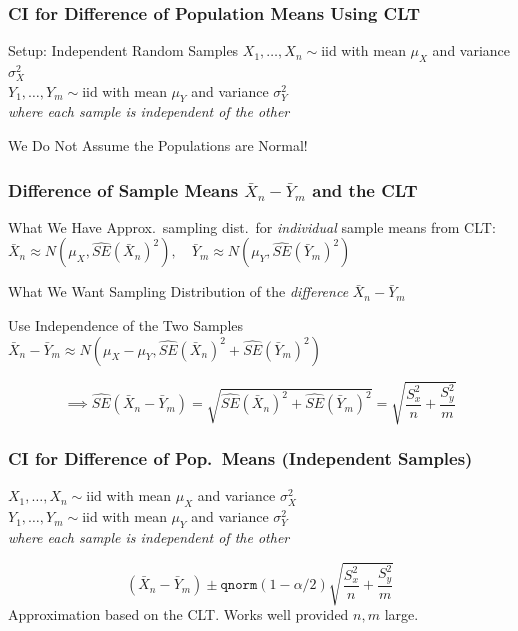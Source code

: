 \documentclass[handout]{beamer}
\begin{document}
\begin{frame}
\frametitle{CI for Difference of Population Means Using CLT}
\begin{block}{Setup: Independent Random Samples}
$X_1, \hdots, X_n \sim \mbox{iid}$ with mean $\mu_X$ and variance $\sigma_X^2$\\ $Y_1, \hdots, Y_m \sim \mbox{iid}$ with mean $\mu_Y$ and variance $\sigma_Y^2$\\
\emph{where each sample is independent of the other } 
\end{block}

\begin{alertblock}{We Do Not Assume the Populations are Normal!}
\end{alertblock}

\end{frame}



\begin{frame}
\frametitle{Difference of Sample Means $\bar{X}_n-\bar{Y}_m$ and the CLT}
\begin{block}{What We Have}
Approx.\ sampling dist.\ for \emph{individual}  sample means from CLT:
\alert{$\bar{X}_n\approx N\left(\mu_X, \widehat{SE}(\bar{X}_n)^2\right), \quad \bar{Y}_m\approx N\left(\mu_Y, \widehat{SE}(\bar{Y}_m)^2\right)$}
\end{block}

\begin{block}{What We Want}
Sampling Distribution of the \emph{difference} $\bar{X}_n - \bar{Y}_m$
\end{block}

\begin{block}{Use Independence of the Two Samples}
\alert{$\bar{X}_n - \bar{Y}_m\approx N\left( \mu_X - \mu_Y, \widehat{SE}(\bar{X}_n)^2 +\widehat{SE}(\bar{Y}_m)^2\right)$}



$$\implies \widehat{SE}(\bar{X}_n - \bar{Y}_m) =  \sqrt{\widehat{SE}(\bar{X}_n)^2 +\widehat{SE}(\bar{Y}_m)^2}  = \sqrt{\displaystyle\frac{S_x^2}{n} + \frac{S_y^2}{m} }$$
\end{block}

\end{frame}
\begin{frame}
\frametitle{CI for Difference of Pop.\ Means (Independent Samples)}

$X_1, \hdots, X_n \sim \mbox{iid}$ with mean $\mu_X$ and variance $\sigma_X^2$\\ $Y_1, \hdots, Y_m \sim \mbox{iid}$ with mean $\mu_Y$ and variance $\sigma_Y^2$\\
\emph{where each sample is independent of the other } 


	$$\left(\bar{X}_n - \bar{Y}_m\right) \pm \texttt{qnorm}(1-\alpha/2) \sqrt{\frac{S_x^2}{n} + \frac{S_y^2}{m}}$$
	\alert{Approximation based on the CLT. Works well provided $n,m$ large.}
\end{frame}
\end{document}
